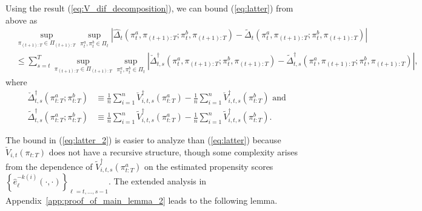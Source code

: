 Using the result (\ref{eq:V_dif_decomposition}), we can bound (\ref{eq:latter}) from above as
\begin{align}
    &\sup_{\pi_{(t+1):T} \in \Pi_{(t+1):T}} \sup_{\pi_{t}^{a},\pi_{t}^{b} \in \Pi_{t}} \left|\widehat{\Delta}_{t}(\pi_{t}^{a},\pi_{(t+1):T};\pi_{t}^{b},\pi_{(t+1):T}) - \widetilde{\Delta}_{t}(\pi_{t}^{a},\pi_{(t+1):T};\pi_{t}^{b},\pi_{(t+1):T})\right| \nonumber \\
    &\leq \sum_{s=t}^{T}\sup_{\pi_{(t+1):T} \in \Pi_{(t+1):T}} \sup_{\pi_{t}^{a},\pi_{t}^{b} \in \Pi_{t}} \left|\check{\Delta}_{t,s}^{\dagger}(\pi_{t}^{a},\pi_{(t+1):T};\pi_{t}^{b},\pi_{(t+1):T}) - \widetilde{\Delta}_{t,s}^{\dagger}(\pi_{t}^{a},\pi_{(t+1):T};\pi_{t}^{b},\pi_{(t+1):T})\right|, \label{eq:latter_2}
\end{align}
where %
\begin{align*}
  \check{\Delta}_{t,s}^{\dagger}(\pi_{t:T}^{a};\pi_{t:T}^{b}) &\equiv \frac{1}{n}\sum_{i=1}^{n} \check{V}_{i,t,s}^{\dagger}\left(\pi_{t:T}^{a}\right) - \frac{1}{n}\sum_{i=1}^{n} \check{V}_{i,t,s}^{\dagger}\left(\pi_{t:T}^{b}\right) \mbox{\ \ and\ }\\
  \widetilde{\Delta}_{t,s}^{\dagger}(\pi_{t:T}^{a};\pi_{t:T}^{b}) &\equiv \frac{1}{n}\sum_{i=1}^{n} \widetilde{V}_{i,t,s}^{\dagger}\left(\pi_{t:T}^{a}\right) - \frac{1}{n}\sum_{i=1}^{n} \widetilde{V}_{i,t,s}^{\dagger}\left(\pi_{t:T}^{b}\right).
\end{align*}

The bound in (\ref{eq:latter_2}) is easier to analyze than (\ref{eq:latter}) because $\check{V}_{i,t}(\pi_{t:T})$ does not have a recursive structure, though some complexity arises from the dependence of $\widetilde{V}_{i,t,s}^{\dagger}\left(\pi_{t:T}^{a}\right)$ on the estimated propensity scores $\left\{\hat{e}_{\ell}^{-k(i)}(\cdot,\cdot)\right\}_{\ell=t,\ldots,s-1}$. The extended analysis in Appendix~\ref{app:proof_of_main_lemma_2} leads to the following lemma.




\medskip

